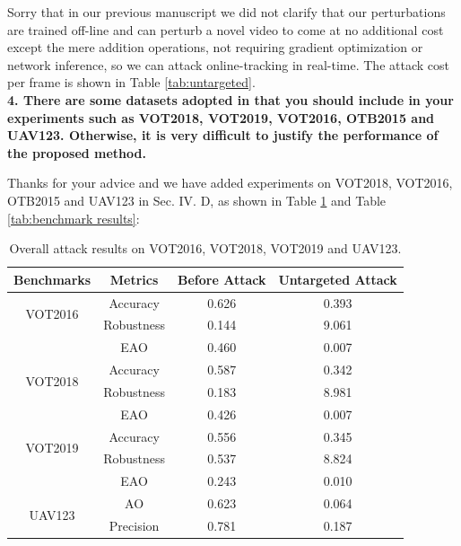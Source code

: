 \documentclass[12pt]{article}
\begin{document}
Sorry that in our previous manuscript we did not clarify that our perturbations are trained off-line and can perturb a novel video to come at no additional cost except the mere addition operations, not requiring gradient optimization or network inference, so we can attack online-tracking in real-time. The attack cost per frame is shown in Table \ref{tab:untargeted}.
\\[6pt]
\noindent \textbf{4. There are some datasets adopted in \cite{SPARK,RTAA} that you should include in your experiments such as VOT2018, VOT2019, VOT2016, OTB2015 and UAV123. Otherwise, it is very difficult to justify the performance of the proposed method.}

Thanks for your advice and we have added experiments on VOT2018, VOT2016, OTB2015 and UAV123 in Sec. IV. D, as shown in Table \ref{tab:benchmark results1} and Table \ref{tab:benchmark results}:

\begin{table}[h]
    \centering
    \caption{Overall attack results on VOT2016, VOT2018, VOT2019 and UAV123.}
    \begin{tabular}{c c | c | c}
    \toprule
    Benchmarks & Metrics & Before Attack    & Untargeted Attack  \\
    \midrule
    \multirow{2}{*}[-6pt]{VOT2016} 
    & Accuracy   & 0.626 & 0.393\\
    & Robustness & 0.144 & 9.061\\
    & EAO        & 0.460 & 0.007\\
    \midrule
    \multirow{2}{*}[-6pt]{VOT2018} 
    & Accuracy   & 0.587 & 0.342\\
    & Robustness & 0.183 & 8.981\\
    & EAO        & 0.426 & 0.007\\
    \midrule
    \multirow{2}{*}[-6pt]{VOT2019} 
    & Accuracy   & 0.556 & 0.345\\
    & Robustness & 0.537 & 8.824\\
    & EAO        & 0.243 & 0.010\\
    \midrule
    \multirow{3}{*}[+6pt]{UAV123} 
    & AO  & 0.623 & 0.064\\
    & Precision & 0.781 & 0.187\\
    \bottomrule
    \end{tabular}
    \label{tab:benchmark results1}
\end{table}
\end{document}

